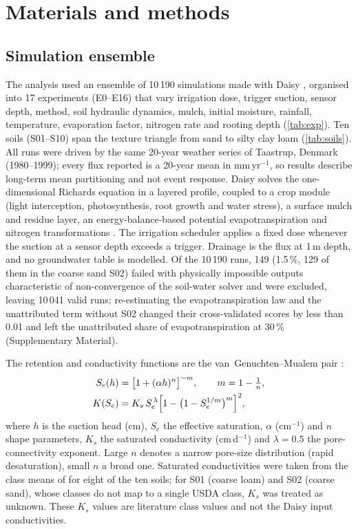 \documentclass[review,12pt,authoryear]{elsarticle}
\begin{document}
\section{Materials and methods}
\subsection{Simulation ensemble}
\label{sec:methods}
The analysis used an ensemble of 10\,190 simulations made with Daisy \citep{Hansen2012,Holbak2026}, organised into 17 experiments (E0--E16) that vary irrigation dose, trigger suction, sensor depth, method, soil hydraulic dynamics, mulch, initial moisture, rainfall, temperature, evaporation factor, nitrogen rate and rooting depth (\cref{tab:exp}). Ten soils (S01--S10) span the texture triangle from sand to silty clay loam (\cref{tab:soils}). All runs were driven by the same 20-year weather series of Taastrup, Denmark (1980--1999); every flux reported is a 20-year mean in mm\,yr$^{-1}$, so results describe long-term mean partitioning and not event response. Daisy solves the one-dimensional Richards equation in a layered profile, coupled to a crop module (light interception, photosynthesis, root growth and water stress), a surface mulch and residue layer, an energy-balance-based potential evapotranspiration and nitrogen transformations \citep{Hansen1991,Hansen2012}. The irrigation scheduler applies a fixed dose whenever the suction at a sensor depth exceeds a trigger. Drainage is the flux at 1\,m depth, and no groundwater table is modelled. Of the 10\,190 runs, 149 (1.5\,\%, 129 of them in the coarse sand S02) failed with physically impossible outputs characteristic of non-convergence of the soil-water solver and were excluded, leaving 10\,041 valid runs; re-estimating the evapotranspiration law and the unattributed term without S02 changed their cross-validated scores by less than 0.01 and left the unattributed share of evapotranspiration at 30\,\% (Supplementary Material).


The retention and conductivity functions are the van~Genuchten--Mualem pair \citep{vanGenuchten1980,Mualem1976}:
\begin{align}
S_e(h) &= \bigl[1+(\alpha h)^{n}\bigr]^{-m}, \qquad m = 1-\tfrac{1}{n},\label{eq:vg}\\
K(S_e) &= K_s\, S_e^{\,\lambda}\Bigl[1-\bigl(1-S_e^{1/m}\bigr)^{m}\Bigr]^{2},\label{eq:mualem}
\end{align}
where $h$ is the suction head (cm), $S_e$ the effective saturation, $\alpha$ (cm$^{-1}$) and $n$ shape parameters, $K_s$ the saturated conductivity (cm\,d$^{-1}$) and $\lambda=0.5$ the pore-connectivity exponent. Large $n$ denotes a narrow pore-size distribution (rapid desaturation), small $n$ a broad one. Saturated conductivities were taken from the class means of \citet{Carsel1988} for eight of the ten soils; for S01 (coarse loam) and S02 (coarse sand), whose classes do not map to a single USDA class, $K_s$ was treated as unknown. These $K_s$ values are literature class values and not the Daisy input conductivities.
\end{document}
